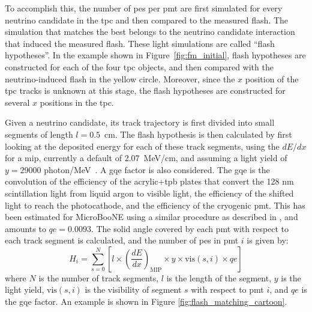 To accomplish this, the number of \acrshort{pe}s per \acrshort{pmt} are first simulated for every neutrino candidate in the \acrshort{tpc} and then compared to the measured flash. The simulation that matches the best belongs to the neutrino candidate interaction that induced the measured flash. These light simulations are called ``flash hypotheses''. In the example shown in Figure~\ref{fig:fm_initial}, flash hypotheses are constructed for each of the four \acrshort{tpc} objects, and then compared with the neutrino-induced flash in the yellow circle. 
Moreover, since the $x$ position of the \acrshort{tpc} tracks is unknown at this stage, the flash hypotheses are constructed for several $x$ positions in the \acrshort{tpc}. 



Given a neutrino candidate, its track trajectory is first divided into small segments of length $l = 0.5$~cm. The flash hypothesis is then calculated by first looking at the deposited energy for each of these track segments, using the $dE/dx$ for a \acrfull{mip}, currently a default of 2.07~MeV/cm, and assuming a light yield of $y = 29000$ photon/MeV~\cite{doke, kubota}. A \acrfull{gqe} factor is also considered. The \acrshort{gqe} is the convolution of the efficiency of the acrylic+\acrshort{tpb} plates that convert the 128 nm scintillation light from liquid argon to visible light, the efficiency of the shifted light to reach the photocathode, and the efficiency of the cryogenic \acrshort{pmt}. This has been estimated for MicroBooNE using a similar procedure as described in \cite{pmt_qe}, and amounts to $qe = 0.0093$.
The solid angle covered by each \acrshort{pmt} with respect to each track segment is calculated, and the number of  \acrshort{pe}s in \acrshort{pmt} $i$ is given by:
\begin{equation}
H_i = \sum_{s=0}^{N} \left[ l \times \left(\frac{dE}{dx}\right)_\text{MIP} \times y \times \text{vis}(s, i) \times qe \right] 
\end{equation}
where $N$ is the number of track segments, $l$ is the length of the segment, $y$ is the light yield, $\text{vis}(s, i)$ is the visibility of segment $s$ with respect to \acrshort{pmt} $i$, and $qe$ is the \acrshort{gqe} factor. An example is shown in Figure \ref{fig:flash_matching_cartoon}.
